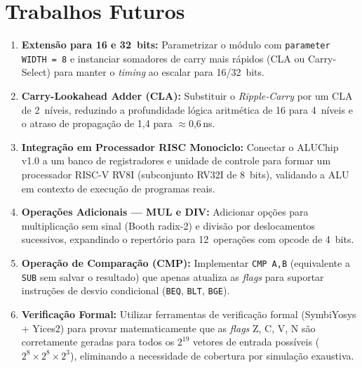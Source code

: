 \documentclass[12pt,a4paper]{article}
\begin{document}
\section{Trabalhos Futuros}

\begin{enumerate}[leftmargin=2em,label=\textbf{TF\arabic*.}]
  \item \textbf{Extensão para 16 e 32~bits:} Parametrizar o módulo com \texttt{parameter WIDTH = 8} e instanciar somadores de carry mais rápidos (CLA ou Carry-Select) para manter o \textit{timing} ao escalar para 16/32~bits.

  \item \textbf{Carry-Lookahead Adder (CLA):} Substituir o \textit{Ripple-Carry} por um CLA de 2~níveis, reduzindo a profundidade lógica aritmética de 16 para 4~níveis e o atraso de propagação de 1,4 para $\approx$0,6\,ns.

  \item \textbf{Integração em Processador RISC Monociclo:} Conectar o ALUChip v1.0 a um banco de registradores e unidade de controle para formar um processador RISC-V RV8I (subconjunto RV32I de 8~bits), validando a ALU em contexto de execução de programas reais.

  \item \textbf{Operações Adicionais --- MUL e DIV:} Adicionar opções para multiplicação sem sinal (Booth radix-2) e divisão por deslocamentos sucessivos, expandindo o repertório para 12~operações com opcode de 4~bits.

  \item \textbf{Operação de Comparação (CMP):} Implementar \texttt{CMP A,B} (equivalente a \texttt{SUB} sem salvar o resultado) que apenas atualiza as \textit{flags} para suportar instruções de desvio condicional (\texttt{BEQ}, \texttt{BLT}, \texttt{BGE}).

  \item \textbf{Verificação Formal:} Utilizar ferramentas de verificação formal (SymbiYosys + Yices2) para provar matematicamente que as \textit{flags} Z, C, V, N são corretamente geradas para todos os $2^{19}$ vetores de entrada possíveis ($2^8 \times 2^8 \times 2^3$), eliminando a necessidade de cobertura por simulação exaustiva.
\end{enumerate}

\end{document}
